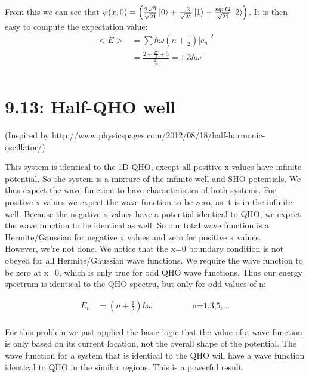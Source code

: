 \documentclass[10pt]{article} %
\begin{document}
From this we can see that $\psi(x,0) = \left(\frac{2\sqrt{2}}{\sqrt{21}}\ket{0}
+ \frac{-3}{\sqrt{21}}\ket{1} + \frac{sqrt{2}}{\sqrt{21}}\ket{2}\right)$. It is then easy to compute
the expectation value: \\

\begin{align*}
  <E> &= \sum \hbar\omega\left(n+\frac{1}{2}\right)|c_n|^2\\
  &= \frac{2 + \frac{27}{4} + 5}{\frac{21}{2}} = 1.3\hbar\omega\\
\end{align*}

\section{9.13: Half-QHO well}
(Inspired by http://www.physicspages.com/2012/08/18/half-harmonic-oscillator/)

This system is identical to the 1D QHO, except all positive x values have infinite
potential. So the system is a mixture of the infinite well and SHO potentials. We
thus expect the wave function to have characteristics of both systems. For positive
x values we expect the wave function to be zero, as it is in the infinite well.
Because the negative x-values have a potential identical to QHO, we expect the wave
function to be identical as well. So our total wave function is a Hermite/Gaussian
for negative x values and zero for positive x values.\\

However, we're not done. We notice that the x=0 boundary condition is not obeyed
for all Hermite/Gaussian wave functions. We require the wave function to be zero
at x=0, which is only true for odd QHO wave functions. Thus our energy spectrum
is identical to the QHO spectru, but only for odd values of n:

\begin{align*}
  E_n &= \left(n + \frac{1}{2}\right)\hbar\omega\hspace{2cm}\mbox{n=1,3,5,...}\\
\end{align*}

For this problem we just applied the basic logic that the value of a wave function
is only based on its current location, not the overall shape of the potential. The
wave function for a system that is identical to the QHO will have a wave function
identical to QHO in the similar regions. This is a powerful result.\\
\end{document}
